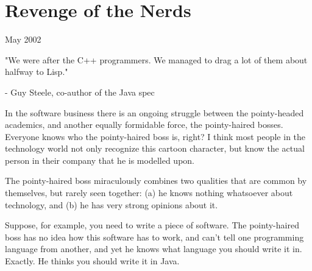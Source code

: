 \chapter{Revenge of the Nerds}


            
              
                


                  May 2002



                  
                    
                      
                        
                          
                            
                              
                                "We were after the C++ programmers. We managed
                                to drag a lot of them about halfway to Lisp."

-
                                Guy Steele, co-author of the Java spec
                              
                            
                          
                        
                      
                    
                  
                  


                  
                  In the software business there is an ongoing struggle between
                  the pointy-headed academics, and another equally formidable
                  force, the pointy-haired bosses. Everyone knows who the
                  pointy-haired boss is, right? I think most people in the
                  technology world not only recognize this cartoon character,
                  but know the actual person in their company that he is
                  modelled upon.

The pointy-haired boss miraculously
                  combines two qualities that are common by themselves, but
                  rarely seen together: (a) he knows nothing whatsoever about
                  technology, and (b) he has very strong opinions about it.

Suppose,
                  for example, you need to write a piece of software. The
                  pointy-haired boss has no idea how this software has to work,
                  and can't tell one programming language from another, and yet
                  he knows what language you should write it in. Exactly. He
                  thinks you should write it in Java.

